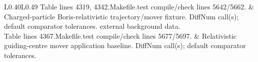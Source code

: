\begin{longtable}{L{0.40\textwidth}L{0.49\textwidth}}
\newline Table lines 4319, 4342.\newline Makefile.test compile/check lines 5642/5662. & Charged-particle Boris-relativistic trajectory/mover fixture. DiffNum call(s); default comparator tolerances. \newline external background data.\\
\newline Table lines 4367.\newline Makefile.test compile/check lines 5677/5697. & Relativistic guiding-centre mover application baseline. DiffNum call(s); default comparator tolerances. \\
\bottomrule
\end{longtable}
